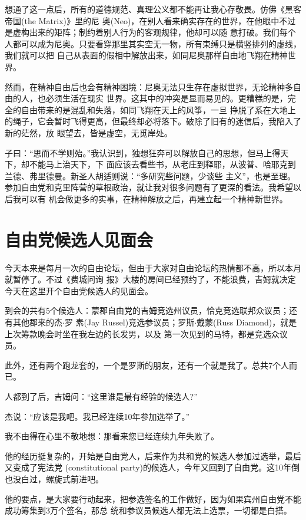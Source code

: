 ﻿\documentclass[11pt]{article}
\begin{document}
想通了这一点后，所有的道德规范、真理公义都不能再让我心存敬畏。仿佛《黑客帝国(the Matrix)》里的尼
奥(Neo)，在别人看来确实存在的世界，在他眼中不过是虚构出来的矩阵；制约着别人行为的客观规律，他却可以随
意打破。我们每个人都可以成为尼奥。只要看穿那里其实空无一物，所有束缚只是横竖排列的虚线，我们就可以把
自己从表面的假相中解放出来，如同尼奥那样自由地飞翔在精神世界。

然而，在精神自由后也会有精神困境：尼奥无法只生存在虚拟世界，无论精神多自由的人，也必须生活在现实
世界。这其中的冲突是显而易见的。更糟糕的是，完全的自由带来的是混乱和失落，如同飞翔在天上的风筝，一旦
挣脱了系在大地上的绳子，它会暂时飞得更高，但最终却必将落下。破除了旧有的迷信后，我陷入了新的茫然，放
眼望去，皆是虚空，无觅岸处。

子曰：``思而不学则殆。''我认识到，独想狂奔可以解放自己的思想，但马上得天下，却不能马上治天下，下
面应该去看些书，从老庄到释耶，从波普、哈耶克到兰德、弗里德曼。新圣人胡适则说：``多研究些问题，少谈些
主义''，也是至理。参加自由党和克里阵营的草根政治，就让我对很多问题有了更深的看法。我希望以后我可以有
机会做更多的实事，在精神解放之后，再建立起一个精神新世界。

\section{自由党候选人见面会}

今天本来是每月一次的自由论坛，但由于大家对自由论坛的热情都不高，所以本月就暂停了。不过《费城问询
报》大楼的房间已经预约了，不能浪费，吉姆就决定今天在这里开个自由党候选人的见面会。

到会的共有5个候选人：蒙郡自由党的吉姆竞选州议员，恰克竞选联邦众议员；还有其他郡来的杰$\cdot$罗
素(Jay Russel)竞选参议员；罗斯$\cdot$戴蒙(Russ Diamond)，就是上次筹款晚会时坐在我左边的长发男，以及
第一次见到的马特，都是竞选众议员。

此外，还有两个跑龙套的，一个是罗斯的朋友，还有一个就是我了。总共7个人而已。

人都到了后，吉姆问：``这里谁是最有经验的候选人?''

杰说：``应该是我吧。我已经连续10年参加选举了。''

我不由得在心里不敬地想：那看来您已经连续九年失败了。

他的经历挺复杂的，开始是自由党人，后来作为共和党的候选人参加过选举，最后又变成了宪法党
(constitutional party)的候选人，今年又回到了自由党。这10年倒也没白过，螺旋式前进吧。

他的要点，是大家要行动起来，把参选签名的工作做好，因为如果宾州自由党不能成功筹集到3万个签名，那总
统和参议员候选人都无法上选票，一切都是白搭。
\end{document}

